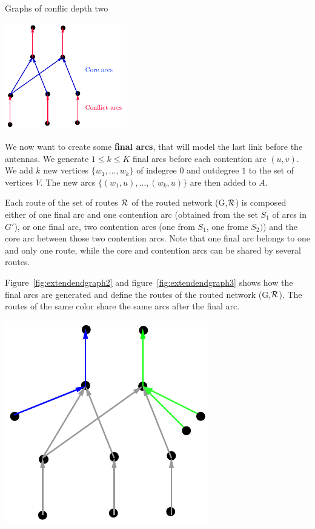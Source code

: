 \documentclass[10pt]{article}
\begin{document}
\begin{section}{Graphs of conflic depth two}
\begin{minipage}{.5\linewidth}
\end{minipage}
\begin{minipage}{.5\linewidth}

\begin{center}
\includegraphics[width=0.4\textwidth]{extendendgraph}
\label{fig:extendendgraph}
\end{center}

\end{minipage}

 We now want to create some \textbf{final arcs}, that will model the last link before the antennas.
We generate $1\leq k\leq K$ final arcs before each contention arc $(u,v)$. We add $k$ new vertices $\{w_1,\ldots,w_k\}$ of indegree $0$ and outdegree $1$ to the set of vertices $V$. The new arcs $\{(w_1,u),\ldots,(w_k,u)\}$ are then added to $A$. 

Each route of the set of routes $\cal{R}$ of the routed network (G,$\cal{R}$) is composed either of one final arc and one contention arc (obtained from the set $S_1$ of arcs in $G'$), or one final arc, two contention arcs (one from $S_1$, one frome $S_2)$) and the core arc between those two contention arcs.
Note that one final arc belongs to one and only one route, while the core and contention arcs can be shared by several routes. 

Figure~\ref{fig:extendendgraph2} and figure~\ref{fig:extendendgraph3} shows how the final arcs are generated and define the routes of the routed network (G,$\cal{R}$). The routes of the same color share the same arcs after the final arc.

\begin{minipage}{.5\linewidth}

\begin{center}
\includegraphics[width=0.4\linewidth]{extendendgraph2}
\label{fig:extendendgraph2}
\end{center}


\end{minipage}
\end{section}
\end{document}

